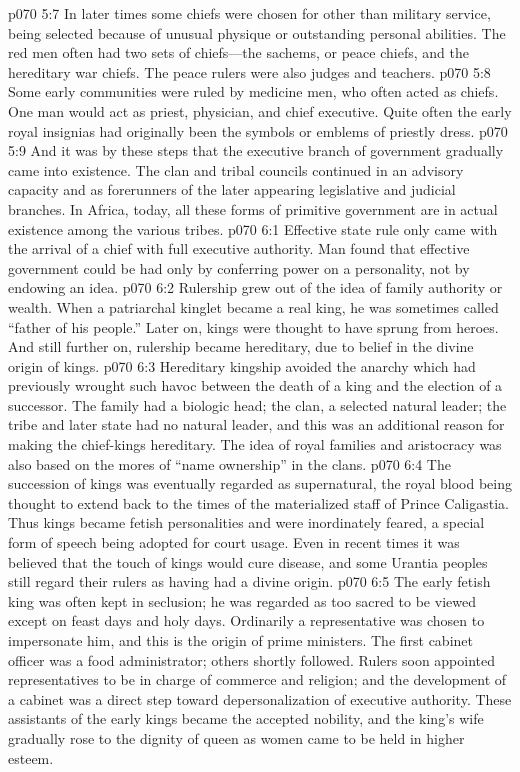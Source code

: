 \vs p070 5:7 In later times some chiefs were chosen for other than military service, being selected because of unusual physique or outstanding personal abilities. The red men often had two sets of chiefs---the sachems, or peace chiefs, and the hereditary war chiefs. The peace rulers were also judges and teachers.
\vs p070 5:8 Some early communities were ruled by medicine men, who often acted as chiefs. One man would act as priest, physician, and chief executive. Quite often the early royal insignias had originally been the symbols or emblems of priestly dress.
\vs p070 5:9 And it was by these steps that the executive branch of government gradually came into existence. The clan and tribal councils continued in an advisory capacity and as forerunners of the later appearing legislative and judicial branches. In Africa, today, all these forms of primitive government are in actual existence among the various tribes.
\vs p070 6:1 Effective state rule only came with the arrival of a chief with full executive authority. Man found that effective government could be had only by conferring power on a personality, not by endowing an idea.
\vs p070 6:2 Rulership grew out of the idea of family authority or wealth. When a patriarchal kinglet became a real king, he was sometimes called “father of his people.” Later on, kings were thought to have sprung from heroes. And still further on, rulership became hereditary, due to belief in the divine origin of kings.
\vs p070 6:3 Hereditary kingship avoided the anarchy which had previously wrought such havoc between the death of a king and the election of a successor. The family had a biologic head; the clan, a selected natural leader; the tribe and later state had no natural leader, and this was an additional reason for making the chief\hyp{}kings hereditary. The idea of royal families and aristocracy was also based on the mores of “name ownership” in the clans.
\vs p070 6:4 The succession of kings was eventually regarded as supernatural, the royal blood being thought to extend back to the times of the materialized staff of Prince Caligastia. Thus kings became fetish personalities and were inordinately feared, a special form of speech being adopted for court usage. Even in recent times it was believed that the touch of kings would cure disease, and some Urantia peoples still regard their rulers as having had a divine origin.
\vs p070 6:5 The early fetish king was often kept in seclusion; he was regarded as too sacred to be viewed except on feast days and holy days. Ordinarily a representative was chosen to impersonate him, and this is the origin of prime ministers. The first cabinet officer was a food administrator; others shortly followed. Rulers soon appointed representatives to be in charge of commerce and religion; and the development of a cabinet was a direct step toward depersonalization of executive authority. These assistants of the early kings became the accepted nobility, and the king’s wife gradually rose to the dignity of queen as women came to be held in higher esteem.
